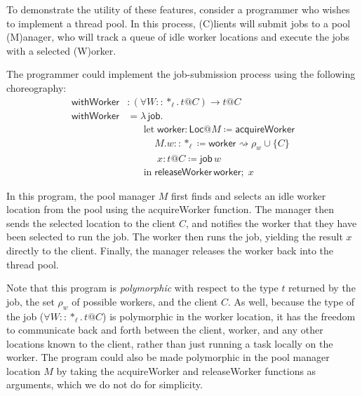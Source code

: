 To demonstrate the utility of these features, consider a programmer who wishes to implement a thread pool.
In this process, (C)lients will submit jobs to a pool (M)anager, who will track a queue of idle worker locations and execute the jobs with a selected (W)orker.

The programmer could implement the job-submission process using the following choreography:
\begin{align*}
\textsf{withWorker} &: (\forall W :: *_\ell.\,t @ C) \rightarrow t @ C\\
\textsf{withWorker} &= \lambda\, \textsf{job}.\\
&\;\;\;\;\;\; \text{let}\; \textsf{worker} : \textsf{Loc} @ M \coloneq  \textsf{acquireWorker}\\
&\;\;\;\;\;\;\;\;\;\; M.w :: *_\ell \coloneq \textsf{worker} \rightsquigarrow \rho_w \cup \{C\} \\
&\;\;\;\;\;\;\;\;\;\;\; x : t @ C \coloneq  \textsf{job}\,w\\
&\;\;\;\;\;\; \text{in}\; \textsf{releaseWorker}\,\textsf{worker};\; x
\end{align*}

In this program, the pool manager $M$ first finds and selects an idle \textsf{worker} location from the pool using the \textsf{acquireWorker} function.
The manager then sends the selected location to the client $C$, and notifies the worker that they have been selected to run the \textsf{job}.
The worker then runs the job, yielding the result $x$ directly to the client.
Finally, the manager releases the worker back into the thread pool.

Note that this program is \emph{polymorphic} with respect to the type $t$ returned by the job, the set $\rho_w$ of possible workers, and the client $C$.
As well, because the type of the \textsf{job} ($\forall W :: *_\ell.\,t @ C$) is polymorphic in the worker location, it has the freedom to communicate back and forth between the client, worker, and any other locations known to the client, rather than just running a task locally on the worker.
The program could also be made polymorphic in the pool manager location $M$ by taking the \textsf{acquireWorker} and \textsf{releaseWorker} functions as arguments, which we do not do for simplicity.

